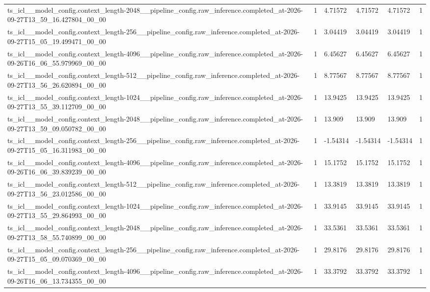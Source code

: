 \begin{tabular}{llllll}
ts\_icl\_\_model\_config.context\_length-2048\_\_pipeline\_config.raw\_inference.completed\_at-2026-09-27T13\_59\_16.427804\_00\_00 & 1 & 4.71572 & 4.71572 & 4.71572 & 1 \\
ts\_icl\_\_model\_config.context\_length-256\_\_pipeline\_config.raw\_inference.completed\_at-2026-09-27T15\_05\_19.499471\_00\_00 & 1 & 3.04419 & 3.04419 & 3.04419 & 1 \\
ts\_icl\_\_model\_config.context\_length-4096\_\_pipeline\_config.raw\_inference.completed\_at-2026-09-26T16\_06\_55.979969\_00\_00 & 1 & 6.45627 & 6.45627 & 6.45627 & 1 \\
ts\_icl\_\_model\_config.context\_length-512\_\_pipeline\_config.raw\_inference.completed\_at-2026-09-27T13\_56\_26.620894\_00\_00 & 1 & 8.77567 & 8.77567 & 8.77567 & 1 \\
ts\_icl\_\_model\_config.context\_length-1024\_\_pipeline\_config.raw\_inference.completed\_at-2026-09-27T13\_55\_39.112709\_00\_00 & 1 & 13.9425 & 13.9425 & 13.9425 & 1 \\
ts\_icl\_\_model\_config.context\_length-2048\_\_pipeline\_config.raw\_inference.completed\_at-2026-09-27T13\_59\_09.050782\_00\_00 & 1 & 13.909 & 13.909 & 13.909 & 1 \\
ts\_icl\_\_model\_config.context\_length-256\_\_pipeline\_config.raw\_inference.completed\_at-2026-09-27T15\_05\_16.311983\_00\_00 & 1 & -1.54314 & -1.54314 & -1.54314 & 1 \\
ts\_icl\_\_model\_config.context\_length-4096\_\_pipeline\_config.raw\_inference.completed\_at-2026-09-26T16\_06\_39.839239\_00\_00 & 1 & 15.1752 & 15.1752 & 15.1752 & 1 \\
ts\_icl\_\_model\_config.context\_length-512\_\_pipeline\_config.raw\_inference.completed\_at-2026-09-27T13\_56\_23.012586\_00\_00 & 1 & 13.3819 & 13.3819 & 13.3819 & 1 \\
ts\_icl\_\_model\_config.context\_length-1024\_\_pipeline\_config.raw\_inference.completed\_at-2026-09-27T13\_55\_29.864993\_00\_00 & 1 & 33.9145 & 33.9145 & 33.9145 & 1 \\
ts\_icl\_\_model\_config.context\_length-2048\_\_pipeline\_config.raw\_inference.completed\_at-2026-09-27T13\_58\_55.740899\_00\_00 & 1 & 33.5361 & 33.5361 & 33.5361 & 1 \\
ts\_icl\_\_model\_config.context\_length-256\_\_pipeline\_config.raw\_inference.completed\_at-2026-09-27T15\_05\_09.070369\_00\_00 & 1 & 29.8176 & 29.8176 & 29.8176 & 1 \\
ts\_icl\_\_model\_config.context\_length-4096\_\_pipeline\_config.raw\_inference.completed\_at-2026-09-26T16\_06\_13.734355\_00\_00 & 1 & 33.3792 & 33.3792 & 33.3792 & 1 \\

\end{tabular}
